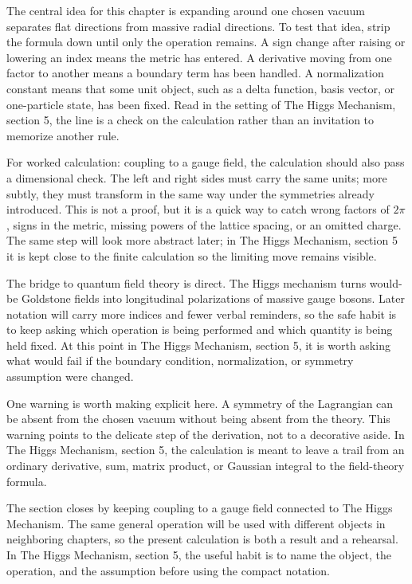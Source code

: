 The central idea for this chapter is expanding around one chosen vacuum separates flat directions from massive radial directions.  To test that idea, strip the formula down until only the operation remains.  A sign change after raising or lowering an index means the metric has entered.  A derivative moving from one factor to another means a boundary term has been handled.  A normalization constant means that some unit object, such as a delta function, basis vector, or one-particle state, has been fixed.  Read in the setting of The Higgs Mechanism, section 5, the line is a check on the calculation rather than an invitation to memorize another rule.

For worked calculation: coupling to a gauge field, the calculation should also pass a dimensional check.  The left and right sides must carry the same units; more subtly, they must transform in the same way under the symmetries already introduced.  This is not a proof, but it is a quick way to catch wrong factors of \(2\pi\), signs in the metric, missing powers of the lattice spacing, or an omitted charge.  The same step will look more abstract later; in The Higgs Mechanism, section 5 it is kept close to the finite calculation so the limiting move remains visible.

The bridge to quantum field theory is direct.  The Higgs mechanism turns would-be Goldstone fields into longitudinal polarizations of massive gauge bosons.  Later notation will carry more indices and fewer verbal reminders, so the safe habit is to keep asking which operation is being performed and which quantity is being held fixed.  At this point in The Higgs Mechanism, section 5, it is worth asking what would fail if the boundary condition, normalization, or symmetry assumption were changed.

One warning is worth making explicit here.  A symmetry of the Lagrangian can be absent from the chosen vacuum without being absent from the theory.  This warning points to the delicate step of the derivation, not to a decorative aside.  In The Higgs Mechanism, section 5, the calculation is meant to leave a trail from an ordinary derivative, sum, matrix product, or Gaussian integral to the field-theory formula.

The section closes by keeping coupling to a gauge field connected to The Higgs Mechanism.  The same general operation will be used with different objects in neighboring chapters, so the present calculation is both a result and a rehearsal.  In The Higgs Mechanism, section 5, the useful habit is to name the object, the operation, and the assumption before using the compact notation.



